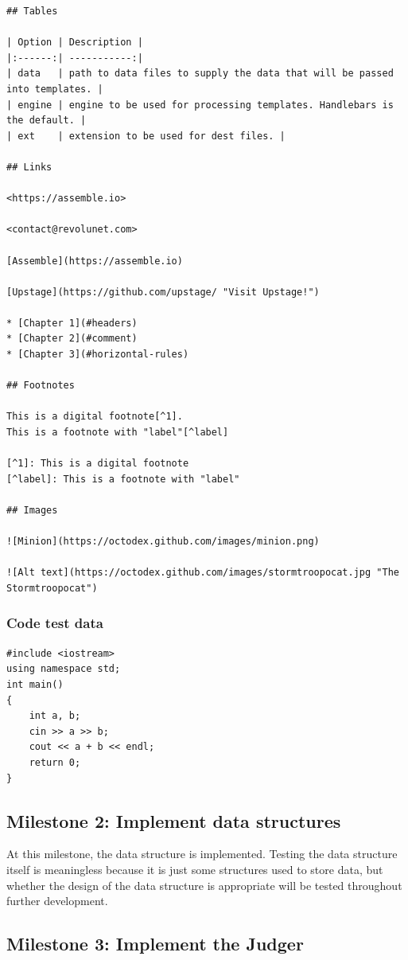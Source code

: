 \documentclass[a4paper]{report}
\begin{document}
\begin{verbatim}
## Tables

| Option | Description |
|:------:| -----------:|
| data   | path to data files to supply the data that will be passed into templates. |
| engine | engine to be used for processing templates. Handlebars is the default. |
| ext    | extension to be used for dest files. |

## Links

<https://assemble.io>

<contact@revolunet.com>

[Assemble](https://assemble.io)

[Upstage](https://github.com/upstage/ "Visit Upstage!")

* [Chapter 1](#headers)
* [Chapter 2](#comment)
* [Chapter 3](#horizontal-rules)

## Footnotes

This is a digital footnote[^1].
This is a footnote with "label"[^label]

[^1]: This is a digital footnote
[^label]: This is a footnote with "label"

## Images

![Minion](https://octodex.github.com/images/minion.png)

![Alt text](https://octodex.github.com/images/stormtroopocat.jpg "The Stormtroopocat")

\end{verbatim}

\subsubsection{Code test data}

\begin{verbatim}
#include <iostream>
using namespace std;
int main()
{
    int a, b;
    cin >> a >> b;
    cout << a + b << endl;
    return 0;
}
\end{verbatim}

\subsection{Milestone 2: Implement data structures}

At this milestone, the data structure is implemented. Testing the data structure itself is meaningless because it is just some structures used to store data, but whether the design of the data structure is appropriate will be tested throughout further development.

\subsection{Milestone 3: Implement the Judger}
\end{document}
